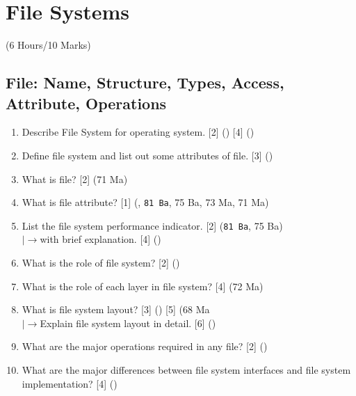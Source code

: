 \documentclass[12pt]{article}
\newcommand{\lb}{\\$\left|\rightarrow\right.$}
\begin{document}
	\pagebreak

\section{File Systems}
	\begin{center}(6 Hours/10 Marks)\end{center}
	\subsection{File: Name, Structure, Types, Access, Attribute, Operations}
		\begin{enumerate}
			\item Describe File System for operating system. \hfill [2] () [4] ()

			\item Define file system and list out some attributes of file. \hfill [3] ()

			\item What is file? \hfill [2] (71 Ma)

			\item What is file attribute? \hfill [1] (, \texttt{81 Ba}, 75 Ba, 73 Ma, 71 Ma)

			\item List the file system performance indicator. \hfill [2] (\texttt{81 Ba}, 75 Ba)
			\lb with brief explanation. \hfill [4] ()

			\item What is the role of file system? \hfill [2] ()

			\item What is the role of each layer in file system? \hfill [4] (72 Ma)

			\item What is file system layout? \hfill [3] () [5] (68 Ma
			\lb Explain file system layout in detail. \hfill [6] ()

			\item What are the major operations required in any file? \hfill [2] ()

			\item What are the major differences between file system interfaces and file system implementation? \hfill [4] ()
		\end{enumerate}
\end{document}
